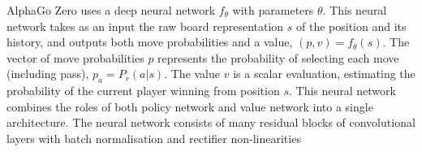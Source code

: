 \documentclass[12pt,a4paper]{article}
\begin{document}
{AlphaGo Zero uses a deep neural network \(f_\theta\) with parameters \(\theta\). This neural network takes as an input the raw board representation \(s\) of the position and its history, and outputs both move probabilities and a value, \((p, v) = f_\theta(s)\). The vector of move probabilities \(p\) represents the probability of selecting each move (including pass), \(p_a = P_r(a|s)\). The value \(v\) is a scalar evaluation, estimating the probability of the current player winning from position \(s\). This neural network combines the roles of both policy network and value network\cite{AlphaGo} into a single architecture. The neural network consists of many residual blocks\cite{ResNet} of convolutional layers\cite{CNNpaper} with batch normalisation\cite{BN} and rectifier non-linearities\cite{ReLU}
}
\clearpage



\end{document}
